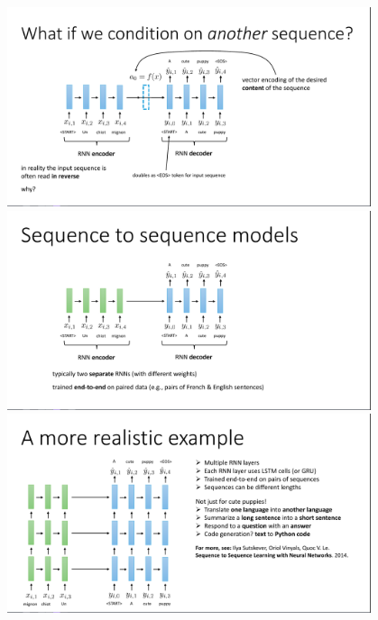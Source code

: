 \documentclass{book}
\begin{document}
\begin{figure}[H]
    \centering
    \includegraphics[width=0.95\textwidth]{images/lec11_3.png}
    \includegraphics[width=0.95\textwidth]{images/lec11_4.png}
    \includegraphics[width=0.95\textwidth]{images/lec11_5.png}
\end{figure}
\end{document}

